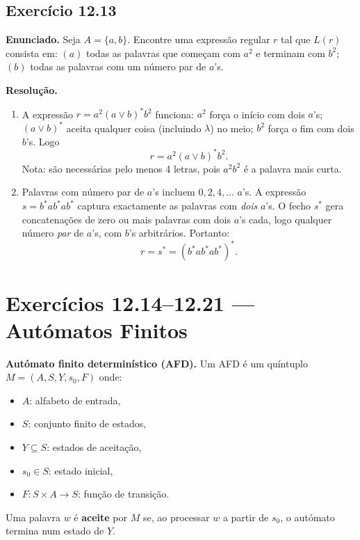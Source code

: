 \documentclass[12pt,a4paper]{article}
\newcommand{\keyword}[1]{\textbf{\textcolor{azul}{#1}}}
\begin{document}
\subsection*{Exercício 12.13}

\textbf{Enunciado.} Seja $A = \{a,b\}$. Encontre uma expressão regular $r$ tal que $L(r)$
consista em:
$(a)$ todas as palavras que começam com $a^2$ e terminam com $b^2$;
$(b)$ todas as palavras com um número par de $a$'s.

\medskip
\textbf{Resolução.}

\begin{enumerate}[label=(\alph*)]
  \item A expressão $r = a^2 (a \vee b)^* b^2$ funciona: $a^2$ força o início com dois
        $a$'s; $(a \vee b)^*$ aceita qualquer coisa (incluindo $\lambda$) no meio;
        $b^2$ força o fim com dois $b$'s. Logo
        \[
          r = a^2(a \vee b)^*b^2.
        \]
        Nota: são necessárias pelo menos 4 letras, pois $a^2b^2$ é a palavra mais curta.

  \item Palavras com número par de $a$'s incluem $0, 2, 4, \ldots$ $a$'s.
        A expressão $s = b^*ab^*ab^*$ captura exactamente as palavras com \emph{dois}
        $a$'s. O fecho $s^*$ gera concatenações de zero ou mais palavras com dois $a$'s
        cada, logo qualquer número \emph{par} de $a$'s, com $b$'s arbitrários. Portanto:
        \[
          r = s^* = (b^*ab^*ab^*)^*.
        \]
\end{enumerate}

\section*{Exercícios 12.14--12.21 — Autómatos Finitos}

\begin{teoriacaixa}
\textbf{Autómato finito determinístico (AFD).}
Um AFD é um quíntuplo $M = (A, S, Y, s_0, F)$ onde:
\begin{itemize}[noitemsep]
  \item $A$: alfabeto de entrada,
  \item $S$: conjunto finito de estados,
  \item $Y \subseteq S$: estados de aceitação,
  \item $s_0 \in S$: estado inicial,
  \item $F: S \times A \to S$: função de transição.
\end{itemize}
Uma palavra $w$ é \keyword{aceite} por $M$ se, ao processar $w$ a partir de $s_0$,
o autómato termina num estado de $Y$.
\end{teoriacaixa}
\end{document}

